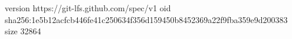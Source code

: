 version https://git-lfs.github.com/spec/v1
oid sha256:1e5b12acfcb446fe41c250634f356d159450b8452369a22f9fba359e9d200383
size 32864
